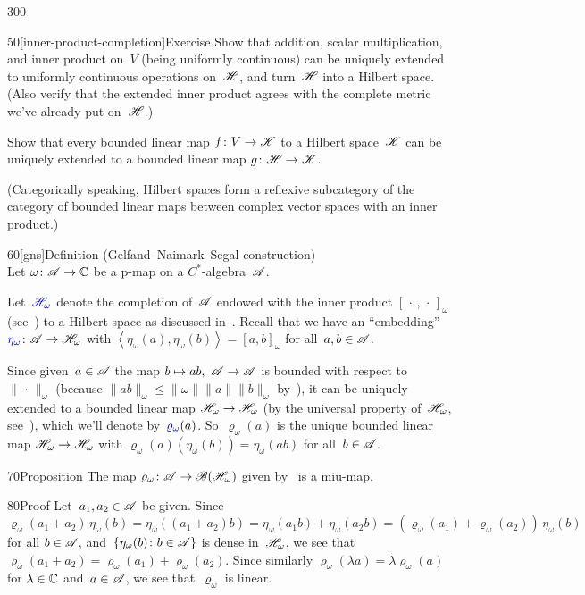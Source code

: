 \begin{parsec}{300}
\begin{point}{50}[inner-product-completion]{Exercise}
Show that addition, scalar multiplication, and inner product on~$V$
(being uniformly continuous)
can be uniquely extended to uniformly continuous operations on~$\mathscr{H}$,
and turn~$\mathscr{H}$ into a Hilbert space.
(Also verify that the extended inner product agrees with the complete
metric we've already put on~$\mathscr{H}$.)

Show that every bounded linear map $f\colon V\to\mathscr{K}$
to a Hilbert space~$\mathscr{K}$
can be uniquely extended to a bounded linear map $g\colon \mathscr{H}\to\mathscr{K}$.

(Categorically speaking,
Hilbert spaces
form a reflexive subcategory of
the category of bounded linear maps between
complex vector spaces with an inner product.)
\end{point}
\begin{point}{60}[gns]{Definition (Gelfand--Naimark--Segal construction)}%
%
	\\
Let $\omega\colon \mathscr{A}\to\mathbb{C}$ be a p-map on a $C^*$-algebra~$\mathscr{A}$.

Let~$\Define{\scrH_\omega}$%
	denote the completion
of~$\mathscr{A}$ endowed with the inner product $[\,\cdot\,,\,\cdot\,]_\omega$
(see~)
to a Hilbert space as discussed in~.
Recall that we have an ``embedding''
$\Define{\eta_\omega}\colon \scrA\to\scrH_\omega$%
with $\left<\eta_\omega(a),\eta_\omega(b)\right>
= [a,b]_\omega$ for all~$a,b\in \mathscr{A}$.

Since given~$a\in \mathscr{A}$
the map $b\mapsto ab,\ \mathscr{A}\to\mathscr{A}$ is
bounded with respect to~$\|\,\cdot\,\|_\omega$
(because $\|ab\|_\omega\leq \|\omega\|\|a\|\|b\|_\omega$
by~),
it can be uniquely extended to a bounded linear map
$\mathscr{H}_\omega\to\mathscr{H}_\omega$
(by the universal property of~$\mathscr{H}_\omega$, 
see~),
which we'll denote by~$\Define{\varrho_\omega}(a)$.%
So~$\varrho_\omega(a)$ is the unique
bounded linear map $\mathscr{H}_\omega\to\mathscr{H}_\omega$
with $\varrho_\omega(a)(\eta_\omega(b)) = \eta_\omega(ab)$
for all~$b\in\mathscr{A}$.
\end{point}
\begin{point}{70}{Proposition}%
The map $\varrho_\omega\colon \mathscr{A}\to\mathscr{B}(\mathscr{H}_\omega)$
given by~ is a miu-map.
\begin{point}{80}{Proof}%
Let~$a_1,a_2\in\mathscr{A}$ be given.
Since $\varrho_\omega(a_1+a_2)\,\eta_\omega(b)
= \eta_\omega((a_1+a_2)b)
= \eta_\omega(a_1b)+\eta_\omega(a_2b)
= (\varrho_\omega(a_1) + \varrho_\omega(a_2))\,\eta_\omega(b)$
for all $b\in\mathscr{A}$,
and~$\{\eta_\omega(b)\colon b\in\mathscr{A}\}$
is dense in~$\mathscr{H}_\omega$,
we see that $\varrho_\omega(a_1+a_2)
=\varrho_\omega(a_1)+\varrho_\omega(a_2)$.
Since similarly $\varrho_\omega(\lambda a)
= \lambda\varrho_\omega(a)$
for $\lambda\in\mathbb{C}$ and~$a\in\mathscr{A}$,
we see that~$\varrho_\omega$ is linear.


\end{point}
\end{point}
\end{parsec}
